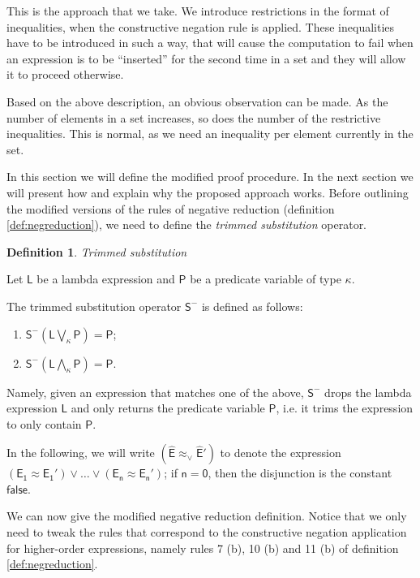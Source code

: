 \documentclass[inscr,ack,preface]{dithesis}
\theoremstyle{definition}
\newtheorem{definition}{Definition}[]
\newcommand{\msf}[1]{$\mathsf{#1}$}
\begin{document}
This is the approach that we take. We introduce restrictions in the format of inequalities, when the constructive negation rule is applied. These inequalities have to be introduced in such a way, that will cause the computation to fail when an expression is to be ``inserted'' for the second time in a set and they will allow it to proceed otherwise.

Based on the above description, an obvious observation can be made. As the number of elements in a set increases, so does the number of the restrictive inequalities. This is normal, as we need an inequality per element currently in the set.

In this section we will define the modified proof procedure. In the next section we will present how and explain why the proposed approach works. Before outlining the modified versions of the rules of negative reduction (definition \ref{def:negreduction}), we need to define the \emph{trimmed substitution} operator.

\begin{definition}{\emph{Trimmed substitution}}
\label{def:trimmedsub}

Let \msf{L} be a lambda expression and \msf{P} be a predicate variable of type $\kappa$.

The trimmed substitution operator \msf{S^{-}} is defined as follows:
\begin{enumerate}
  \item \msf{S^{-}\left( L \bigvee_{\kappa} P \right) = P };
  \item \msf{S^{-}\left( L \bigwedge_{\kappa} P \right) = P }.
\end{enumerate}

Namely, given an expression that matches one of the above, \msf{S^{-}} drops the lambda expression \msf{L} and only returns the predicate variable \msf{P}, i.e. it trims the expression to only contain \msf{P}.
\end{definition}

In the following, we will write \msf{\left( \widehat{E} \approx_{\lor} \widehat{E}' \right)} to denote the expression \msf{ \left( E_{1} \approx E_{1}' \right) \lor \dots \lor \left( E_{n} \approx E_{n}' \right)}; if \msf{n=0}, then the disjunction is the constant \msf{false}.

We can now give the modified negative reduction definition. Notice that we only need to tweak the rules that correspond to the constructive negation application for higher-order expressions, namely rules 7 (b), 10 (b) and 11 (b) of definition \ref{def:negreduction}.
\end{document}
